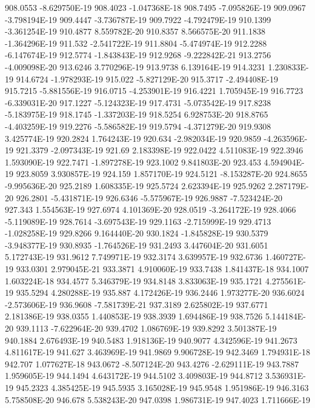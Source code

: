 908.0553  -8.629750E-19
908.4023  -1.047368E-18
908.7495  -7.095826E-19
909.0967  -3.798194E-19
909.4447  -3.736787E-19
909.7922  -4.792479E-19
910.1399  -3.361254E-19
910.4877  8.559782E-20
910.8357  8.566575E-20
911.1838  -1.364296E-19
911.532  -2.541722E-19
911.8804  -5.474974E-19
912.2288  -6.147674E-19
912.5774  -1.843843E-19
912.9268  -9.222842E-21
913.2756  -4.009098E-20
913.6246  3.770296E-19
913.9738  6.139164E-19
914.3231  1.230833E-19
914.6724  -1.978293E-19
915.022  -5.827129E-20
915.3717  -2.494408E-19
915.7215  -5.881556E-19
916.0715  -4.253901E-19
916.4221  1.705945E-19
916.7723  -6.339031E-20
917.1227  -5.124323E-19
917.4731  -5.073542E-19
917.8238  -5.183975E-19
918.1745  -1.337203E-19
918.5254  6.928753E-20
918.8765  -4.403259E-19
919.2276  -5.586582E-19
919.5794  -4.371279E-20
919.9308  3.425774E-19
920.2824  1.764243E-19
920.634  -2.982034E-19
920.9859  -4.263596E-19
921.3379  -2.097343E-19
921.69  2.183398E-19
922.0422  4.511083E-19
922.3946  1.593090E-19
922.7471  -1.897278E-19
923.1002  9.841803E-20
923.453  4.594904E-19
923.8059  3.930857E-19
924.159  1.857170E-19
924.5121  -8.153287E-20
924.8655  -9.995636E-20
925.2189  1.608335E-19
925.5724  2.623394E-19
925.9262  2.287179E-20
926.2801  -5.431871E-19
926.6346  -5.575967E-19
926.9887  -7.523424E-20
927.343  1.554563E-19
927.6974  4.101369E-20
928.0519  -3.264172E-19
928.4066  -5.119089E-19
928.7614  -3.697543E-19
929.1163  -2.715999E-19
929.4713  -1.028258E-19
929.8266  9.164440E-20
930.1824  -1.845828E-19
930.5379  -3.948377E-19
930.8935  -1.764526E-19
931.2493  3.447604E-20
931.6051  5.172743E-19
931.9612  7.749971E-19
932.3174  3.639957E-19
932.6736  1.460727E-19
933.0301  2.979045E-21
933.3871  4.910060E-19
933.7438  1.841437E-18
934.1007  1.603224E-18
934.4577  5.346379E-19
934.8148  3.833063E-19
935.1721  4.275561E-19
935.5294  4.280288E-19
935.887  4.172426E-19
936.2446  1.973277E-20
936.6024  -2.573606E-19
936.9608  -7.581739E-21
937.3189  2.625802E-19
937.6771  2.181386E-19
938.0355  1.440853E-19
938.3939  1.694486E-19
938.7526  5.144184E-20
939.1113  -7.622964E-20
939.4702  1.086769E-19
939.8292  3.501387E-19
940.1884  2.676493E-19
940.5483  1.918136E-19
940.9077  4.342596E-19
941.2673  4.811617E-19
941.627  3.463969E-19
941.9869  9.906728E-19
942.3469  1.794931E-18
942.707  1.077627E-18
943.0672  -8.507124E-20
943.4276  -2.629111E-19
943.7887  1.959605E-19
944.1494  4.643172E-19
944.5102  3.409803E-19
944.8712  3.536931E-19
945.2323  4.385425E-19
945.5935  3.165028E-19
945.9548  1.951986E-19
946.3163  5.758508E-20
946.678  5.538243E-20
947.0398  1.986731E-19
947.4023  1.711666E-19
